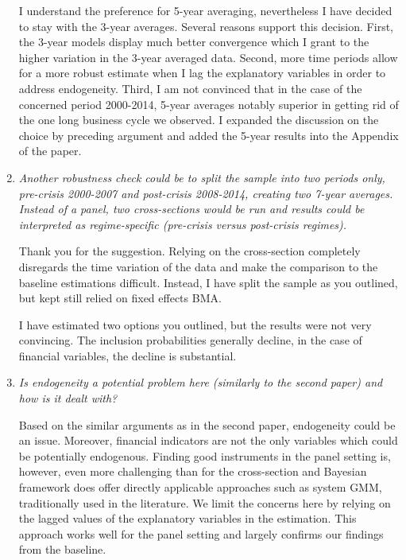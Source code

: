 \begin{enumerate}[resume]
    I understand the preference for 5-year averaging, nevertheless I have decided to stay with the 3-year averages. Several reasons support this decision. First, the 3-year models display much better convergence which I grant to the higher variation in the 3-year averaged data. Second, more time periods allow for a more robust estimate when I lag the explanatory variables in order to address endogeneity. {\color{red}Third, I am not convinced that in the case of the concerned period 2000-2014, 5-year averages notably superior in getting rid of the one long business cycle we observed}. I expanded the discussion on the choice by preceding argument and added the 5-year results into the Appendix of the paper.

    \item \textit{Another robustness check could be to split the sample into two periods only, pre-crisis 2000-2007 and post-crisis 2008-2014, creating two 7-year averages. Instead of a panel, two cross-sections would be run and results could be interpreted as regime-specific (pre-crisis versus post-crisis regimes).}
    
    Thank you for the suggestion. Relying on the cross-section completely disregards the time variation of the data and make the comparison to the baseline estimations difficult. Instead, I have split the sample as you outlined, but kept still relied on fixed effects \ac{BMA}.
    
    {\color{red}I have estimated two options you outlined, but the results were not very convincing. The inclusion probabilities generally decline, in the case of financial variables, the decline is substantial.}

    \item \textit{Is endogeneity a potential problem here (similarly to the second paper) and how is it dealt with?}
    
    Based on the similar arguments as in the second paper, endogeneity could be an issue. Moreover, financial indicators are not the only variables which could be potentially endogenous. Finding good instruments in the panel setting is, however, even more challenging than for the cross-section and Bayesian framework does offer directly applicable approaches such as system GMM, traditionally used in the literature. We limit the concerns here by relying on the lagged values of the explanatory variables in the estimation. This approach works well for the panel setting and largely confirms our findings from the baseline. 

\end{enumerate}

